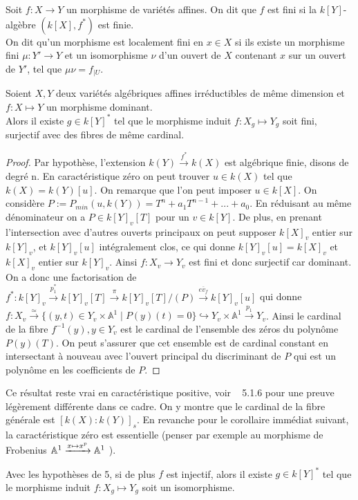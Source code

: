\begin{defn}
Soit $f:X \rightarrow Y$ un morphisme de variétés affines. On dit que $f$ est fini si la $k[Y]$-algèbre $(k[X], f^*)$ est finie.\\
On dit qu'un morphisme est localement fini en $x\in X$ si ils existe un morphisme fini $\mu:Y' \rightarrow Y$ et un isomorphisme $\nu$ d'un ouvert de $X$ contenant $x$ sur un ouvert de $Y'$, tel que $\mu\nu =f_{|U}$.
\end{defn}

\begin{prop}Soient $X,Y$ deux variétés algébriques affines irréductibles de même dimension et $f:X \mapsto Y$ un morphisme dominant.\\
Alors il existe $g\in k[Y]^*$ tel que le morphisme induit $f:X_g \mapsto Y_g$ soit fini, surjectif avec des fibres de même cardinal.
\end{prop}
\begin{proof}
Par hypothèse, l'extension $k(Y) \xrightarrow{f^*} k(X)$ est algébrique finie, disons de degré n. En caractéristique zéro on peut trouver $u\in k(X)$ tel que $k(X)=k(Y)[u]$. On remarque que l'on peut imposer $u\in k[X]$. On considère $P:=P_{min}(u, k(Y))=T^n+a_1T^{n-1}+...+a_0$. En réduisant au même dénominateur on a $P\in k[Y]_v[T]$ pour un $v\in k[Y]$. De plus, en prenant l'intersection avec d'autres ouverts principaux on peut supposer $k[X]_v$ entier sur $k[Y]_v$, et $k[Y]_v[u]$ intégralement clos, ce qui donne $k[Y]_v[u]=k[X]_v$ et $k[X]_v$ entier sur $k[Y]_v$. Ainsi $f:X_v \rightarrow Y_v$ est fini et donc surjectif car dominant.\\
On a donc une factorisation de $f^*:k[Y]_v\xrightarrow{p_1^*}k[Y]_v[T]\xrightarrow{\pi}k[Y]_v[T]/(P)\xrightarrow{\overline{ev_f}}k[Y]_v[u]$ qui donne $f:X_v \xrightarrow{\simeq} \lbrace (y,t) \in Y_v\times \mathbb{A}^1\mid P(y)(t)=0\rbrace \hookrightarrow Y_v\times \mathbb{A}^1 \xrightarrow{p_1} Y_v$. Ainsi le cardinal de la fibre $f^{-1}(y), y\in Y_v$ est le cardinal de l'ensemble des zéros du polynôme $P(y)(T)$. On peut s'assurer que cet ensemble est de cardinal constant en intersectant à nouveau avec l'ouvert principal du discriminant de $P$ qui est un polynôme en les coefficients de $P$.
\end{proof}

Ce résultat reste vrai en caractéristique positive, voir 
~\cite{LAGSpringer} 5.1.6 pour une preuve légèrement différente dans ce cadre. On y montre que le cardinal de la fibre générale est $[k(X):k(Y)]_s$. En revanche pour le corollaire immédiat suivant, la caractéristique zéro est essentielle (penser par exemple au morphisme de Frobenius $\mathbb{A}^1 \xrightarrow{x \mapsto x^p} \mathbb{A}^1$ ). 
\begin{cor}
Avec les hypothèses de 5, si de plus $f$ est injectif, alors il existe $g\in k[Y]^*$ tel que le morphisme induit $f:X_g \mapsto Y_g$ soit un isomorphisme.
\end{cor}

